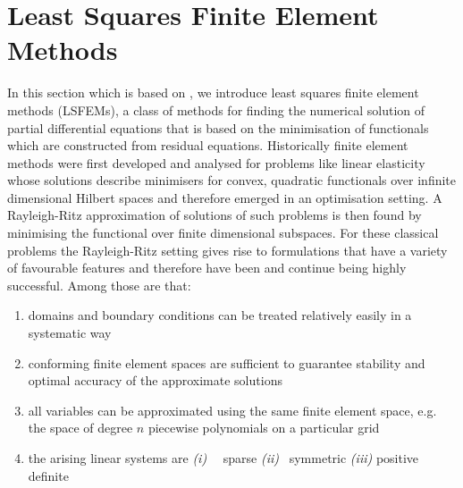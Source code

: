 \documentclass[../draft_1.tex]{subfiles}
\begin{document}
\section{Least Squares Finite Element Methods}

In this section 
which is based on  \cite{bochev2009least}, %
we introduce least squares finite element methods (LSFEMs), a class of methods for finding the numerical solution of partial differential equations that is based on the minimisation of functionals which are constructed from residual equations. Historically finite element methods were first developed and analysed for problems like linear elasticity whose solutions describe minimisers for convex, quadratic functionals over infinite dimensional Hilbert spaces and therefore emerged in an optimisation setting. A Rayleigh-Ritz approximation of solutions of such problems is then found by minimising the functional over finite dimensional subspaces. For these classical problems the Rayleigh-Ritz setting gives rise to formulations that have a variety of favourable features and therefore have been and continue being highly successful.  Among those are that:

\begin{enumerate}
	\item domains and boundary conditions can be treated relatively easily in a systematic way 
	\item conforming finite element spaces are sufficient to guarantee stability and optimal accuracy of the approximate solutions
	\item all variables can be approximated using the same finite element space, e.g. the space of degree $n$ piecewise polynomials on a particular grid
	\item the arising linear systems are 
	\subitem \textit{(i)}  \ \ sparse
	\subitem \textit{(ii)}  \ symmetric
	\subitem \textit{(iii)} positive definite
\end{enumerate}
\end{document}
